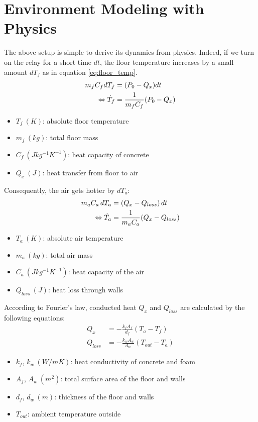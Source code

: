 \documentclass[../main.tex]{subfiles}
\begin{document}
\section{Environment Modeling with Physics} \label{sec:env_model}
The above setup is simple to derive its dynamics from physics. Indeed, if we turn on the relay for a short time $dt$, the floor temperature increases by a small amount $dT_f$ as in equation \ref{eq:floor_temp}.
\begin{align} \label{eq:floor_temp}
    m_f C_f dT_f &= (P_0 - Q_x) dt \notag \\
    \Leftrightarrow \dot{T}_f &= \frac{1}{m_f C_f}(P_0 - Q_x)
\end{align}
\begin{itemize}
    \item $T_f~(K)$: absolute floor temperature
    \item $m_f~(kg)$: total floor mass
    \item $C_f~(Jkg^{-1}K^{-1})$: heat capacity of concrete
    \item $Q_x~(J)$: heat transfer from floor to air
\end{itemize}
Consequently, the air gets hotter by $dT_a$:
\begin{align}
    m_a C_a \,dT_a &= (Q_x - Q_{loss}) \,dt \notag \\
    \Leftrightarrow \dot{T}_a &= \frac{1}{m_a C_a} (Q_x - Q_{loss})
    \label{eq:air_temp}
\end{align}
\begin{itemize}
    \item $T_a~(K)$: absolute air temperature
    \item $m_a~(kg)$: total air mass
    \item $C_a~(Jkg^{-1}K^{-1})$: heat capacity of the air
    \item $Q_{loss}~(J)$: heat loss through walls
\end{itemize}
According to Fourier's law, conducted heat $Q_x$ and $Q_{loss}$ are calculated by the following equations:
\begin{equation}
    \begin{split}
        Q_x &= -\frac{k_f A_f}{d_f}(T_a - T_f) \\
        Q_{loss} &= -\frac{k_w A_w}{d_w}(T_{out} - T_a) 
    \end{split}
    \label{eq:heat_transfer}
\end{equation}
\begin{itemize}
    \item $k_f$, $k_w~(W/mK)$: heat conductivity of concrete and foam
    \item $A_f$, $A_w~(m^2)$: total surface area of the floor and walls
    \item $d_f$, $d_w~(m)$: thickness of the floor and walls
    \item $T_{out}$: ambient temperature outside
\end{itemize}
\end{document}
